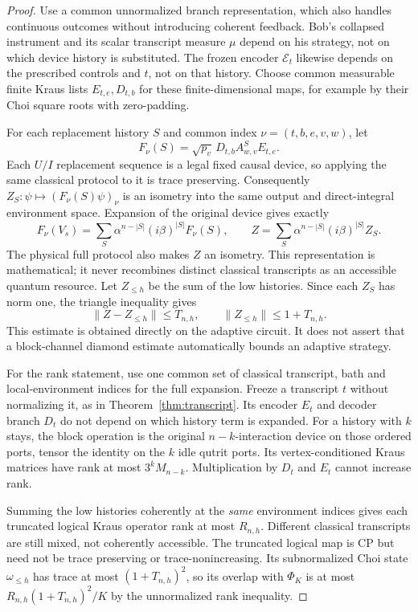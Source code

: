 \documentclass[11pt]{article}
\newcommand{\norm}[1]{\lVert #1\rVert}
\newcommand{\Ph}{\Phi_K}
\begin{document}
\begin{proof}
Use a common unnormalized branch representation, which also handles continuous outcomes without introducing coherent feedback. Bob's collapsed instrument and its scalar transcript measure $\mu$ depend on his strategy, not on which device history is substituted. The frozen encoder $\mathcal E_t$ likewise depends on the prescribed controls and $t$, not on that history. Choose common measurable finite Kraus lists $E_{t,e},D_{t,b}$ for these finite-dimensional maps, for example by their Choi square roots with zero-padding.

For each replacement history $S$ and common index $\nu=(t,b,e,v,w)$, let
\[
 F_\nu(S)=\sqrt{p_v}\,D_{t,b}A^S_{w,v}E_{t,e}.
\]
Each $U/I$ replacement sequence is a legal fixed causal device, so applying the same classical protocol to it is trace preserving. Consequently $Z_S:\psi\mapsto(F_\nu(S)\psi)_\nu$ is an isometry into the same output and direct-integral environment space. Expansion of the original device gives exactly
\[
 F_\nu(V_s)=\sum_S\alpha^{n-|S|}(i\beta)^{|S|}F_\nu(S),
 \qquad Z=\sum_S\alpha^{n-|S|}(i\beta)^{|S|}Z_S.
\]
The physical full protocol also makes $Z$ an isometry. This representation is mathematical; it never recombines distinct classical transcripts as an accessible quantum resource. Let $Z_{\le h}$ be the sum of the low histories. Since each $Z_S$ has norm one, the triangle inequality gives
\[
 \norm{Z-Z_{\le h}}\le T_{n,h},\qquad \norm{Z_{\le h}}\le1+T_{n,h}.
\]
This estimate is obtained directly on the adaptive circuit. It does not assert that a block-channel diamond estimate automatically bounds an adaptive strategy.

For the rank statement, use one common set of classical transcript, bath and local-environment indices for the full expansion. Freeze a transcript $t$ without normalizing it, as in Theorem~\ref{thm:transcript}. Its encoder $E_t$ and decoder branch $D_t$ do not depend on which history term is expanded. For a history with $k$ stays, the block operation is the original $n-k$-interaction device on those ordered ports, tensor the identity on the $k$ idle qutrit ports. Its vertex-conditioned Kraus matrices have rank at most $3^kM_{n-k}$. Multiplication by $D_t$ and $E_t$ cannot increase rank.

Summing the low histories coherently at the \emph{same} environment indices gives each truncated logical Kraus operator rank at most $R_{n,h}$. Different classical transcripts are still mixed, not coherently accessible. The truncated logical map is CP but need not be trace preserving or trace-nonincreasing. Its subnormalized Choi state $\omega_{\le h}$ has trace at most $(1+T_{n,h})^2$, so its overlap with $\Ph$ is at most $R_{n,h}(1+T_{n,h})^2/K$ by the unnormalized rank inequality.


\end{proof}
\end{document}

